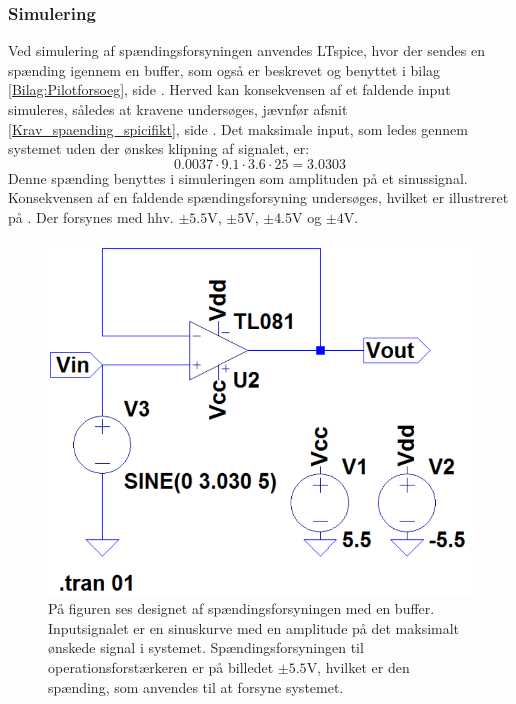 \subsubsection{Simulering}
Ved simulering af spændingsforsyningen anvendes LTspice, hvor der sendes en spænding igennem en buffer, som også er beskrevet og benyttet i bilag \ref{Bilag:Pilotforsoeg}, side \pageref{Bilag:Pilotforsoeg}. Herved kan konsekvensen af et faldende input simuleres, således at kravene undersøges, jævnfør afsnit \ref{Krav_spaending_spicifikt}, side \pageref{Krav_spaending_spicifikt}. Det maksimale input, som ledes gennem systemet uden der ønskes klipning af signalet, er:
\begin{equation}
0.0037 \cdot 9.1 \cdot 3.6 \cdot 25 = 3.0303
\end{equation}
\indent Denne spænding benyttes i simuleringen som amplituden på et sinussignal. Konsekvensen af en faldende spændingsforsyning undersøges, hvilket er illustreret på . Der forsynes med hhv. $\pm5.5$V, $\pm5$V, $\pm4.5$V og $\pm4$V.
\begin{figure}[H]
	\centering
	\includegraphics[scale=0.4]{figures/cProblemloesning/Spaendingsforsyning_LTspice2.PNG}
	\caption{På figuren ses designet af spændingsforsyningen med en buffer. Inputsignalet er en sinuskurve med en amplitude på det maksimalt ønskede signal i systemet. Spændingsforsyningen til operationsforstærkeren er på billedet $\pm5.5$V, hvilket er den spænding, som anvendes til at forsyne systemet.}
	\label{fig:spaendingsforsyning}
\end{figure}
